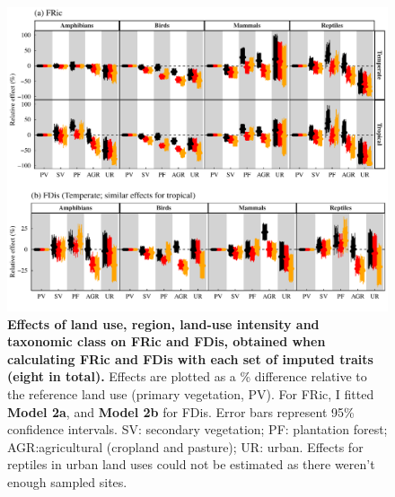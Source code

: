 \begin{figure}[h!]
\centering
\includegraphics[scale=0.7]{Supporting/Chapter3/Figures/Figure_SI_23}
\caption[Effects of land use, region, land-use intensity and taxonomic class on FRic and FDis, obtained when calculating FRic and FDis with each set of imputed traits]{\textbf{Effects of land use, region, land-use intensity and taxonomic class on FRic and FDis, obtained when calculating FRic and FDis with each set of imputed traits (eight in total).} Effects are plotted as a \% difference relative to the reference land use (primary vegetation, PV). For FRic, I fitted \textbf{Model 2a}, and \textbf{Model 2b} for FDis. Error bars represent 95\% confidence intervals. SV: secondary vegetation; PF: plantation forest; AGR:agricultural (cropland and pasture); UR: urban. Effects for reptiles in urban land uses could not be estimated as there weren’t enough sampled sites.}
\label{SI3_F24}
\end{figure}


